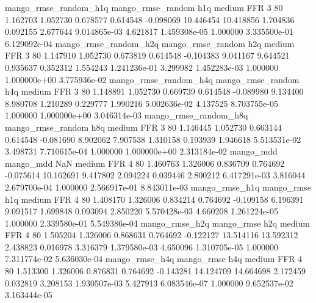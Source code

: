 mango_rmse_random_h1q mango_rmse_random                  h1q     medium      FFR                 3 80  1.162703       1.052730 0.678577       0.614548   -0.098069     10.446454     10.418856     1.704836       0.092155  2.677644 9.014865e-03     4.621817   1.459308e-05            1.000000    3.335500e-01        6.129092e-04
mango_rmse_random_h2q mango_rmse_random                  h2q     medium      FFR                 3 80  1.147910       1.052730 0.673819       0.614548   -0.104383      9.041167      9.644521     0.935637       0.352312  1.554243 1.241236e-01     3.299982   1.452283e-03            1.000000    1.000000e+00        3.775936e-02
mango_rmse_random_h4q mango_rmse_random                  h4q     medium      FFR                 3 80  1.148891       1.052730 0.669739       0.614548   -0.089980      9.134400      8.980708     1.210289       0.229777  1.990216 5.002636e-02     4.137525   8.703755e-05            1.000000    1.000000e+00        3.046314e-03
mango_rmse_random_h8q mango_rmse_random                  h8q     medium      FFR                 3 80  1.146445       1.052730 0.663144       0.614548   -0.081690      8.902062      7.907538     1.310158       0.193939  1.946618 5.513531e-02     3.498731   7.710615e-04            1.000000    1.000000e+00        2.313184e-02
            mango_mdd         mango_mdd                  NaN     medium      FFR                 4 80  1.460763       1.326006 0.836709       0.764692   -0.075614     10.162691      9.417802     2.094224       0.039446  2.800212 6.417291e-03     3.816044   2.679700e-04            1.000000    2.566917e-01        8.843011e-03
       mango_rmse_h1q        mango_rmse                  h1q     medium      FFR                 4 80  1.408170       1.326006 0.834214       0.764692   -0.109158      6.196391      9.091517     1.699848       0.093094  2.850220 5.570428e-03     4.660208   1.261224e-05            1.000000    2.339580e-01        5.549386e-04
       mango_rmse_h2q        mango_rmse                  h2q     medium      FFR                 4 80  1.505204       1.326006 0.868631       0.764692   -0.122127     13.514116     13.592312     2.438823       0.016978  3.316379 1.379580e-03     4.650096   1.310705e-05            1.000000    7.311774e-02        5.636030e-04
       mango_rmse_h4q        mango_rmse                  h4q     medium      FFR                 4 80  1.513300       1.326006 0.876831       0.764692   -0.143281     14.124709     14.664698     2.172459       0.032819  3.208153 1.930507e-03     5.427913   6.083546e-07            1.000000    9.652537e-02        3.163444e-05
